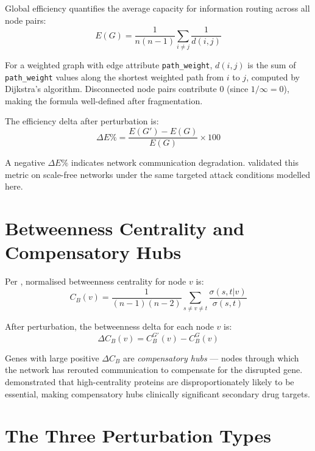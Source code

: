 \documentclass[12pt,a4paper]{report}
\begin{document}
Global efficiency \citep{latora2001efficient} quantifies the average capacity for information routing across all node pairs:
\begin{equation}
  E(G) = \frac{1}{n(n-1)} \sum_{i \neq j} \frac{1}{d(i,j)}
\end{equation}

For a weighted graph with edge attribute \texttt{path\_weight}, $d(i,j)$ is the sum of \texttt{path\_weight} values along the shortest weighted path from $i$ to $j$, computed by Dijkstra's algorithm. Disconnected node pairs contribute 0 (since $1/\infty = 0$), making the formula well-defined after fragmentation.

The efficiency delta after perturbation is:
\begin{equation}
  \Delta E\% = \frac{E(G') - E(G)}{E(G)} \times 100
\end{equation}

A negative $\Delta E\%$ indicates network communication degradation. \citet{crucitti2003efficiency} validated this metric on scale-free networks under the same targeted attack conditions modelled here.

\section{Betweenness Centrality and Compensatory Hubs}

Per \citet{freeman1977set}, normalised betweenness centrality for node $v$ is:
\begin{equation}
  C_B(v) = \frac{1}{(n-1)(n-2)} \sum_{s \neq v \neq t} \frac{\sigma(s,t|v)}{\sigma(s,t)}
\end{equation}

After perturbation, the betweenness delta for each node $v$ is:
\begin{equation}
  \Delta C_B(v) = C_B^{G'}(v) - C_B^{G}(v)
\end{equation}

Genes with large positive $\Delta C_B$ are \textit{compensatory hubs} — nodes through which the network has rerouted communication to compensate for the disrupted gene. \citet{jeong2001lethality} demonstrated that high-centrality proteins are disproportionately likely to be essential, making compensatory hubs clinically significant secondary drug targets.

\section{The Three Perturbation Types}
\end{document}
